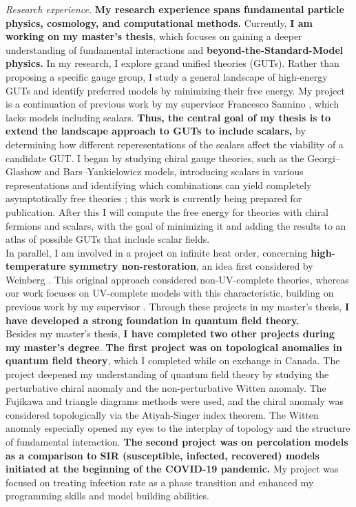 \documentclass[a4paper, 11pt]{article}
\begin{document}
\textit{Research experience.}
\textbf{My research experience spans fundamental particle physics, cosmology, and computational methods.} Currently, \textbf{I am working on my master’s thesis}, which focuses on gaining a deeper understanding of fundamental interactions and \textbf{beyond-the-Standard-Model physics.} In my research, I explore grand unified theories (GUTs). Rather than proposing a specific gauge group, I study a general landscape of high-energy GUTs and identify preferred models by minimizing their free energy. My project is a continuation of previous work by my supervisor Francesco Sannino \cite{Cacciapaglia:2025gta}, which lacks models including scalars. \textbf{Thus, the central goal of my thesis is to extend the landscape approach to GUTs to include scalars,} by determining how different reperesentations of the scalars affect the viability of a candidate GUT.  I began by studying chiral gauge theories, such as the Georgi–Glashow \cite{PhysRevLett.32.438} and Bars–Yankielowicz \cite{Bars1981BY} models, introducing scalars in various representations and identifying which combinations can yield completely asymptotically free theories \cite{SoftenedGravity,Pica2017ConformalPhase,M_lgaard_2017}; this work is currently being prepared for publication. After this I will compute the free energy for theories with chiral fermions and scalars, with the goal of minimizing it and adding the results to an atlas of possible GUTs that include scalar fields. \\
In parallel, I am involved in a project on infinite heat order, concerning \textbf{high-temperature symmetry non-restoration}, an idea first considered by Weinberg \cite{Weinberg1974}. This original approach considered non-UV-complete theories, whereas our work focuses on UV-complete models with this characteristic, building on previous work by my supervisor \cite{BajcLugoSannino2020}.
Through these projects in my master's thesis, \textbf{I have developed a strong foundation in quantum field theory.}\\

Besides my master’s thesis, \textbf{I have completed two other projects during my master’s degree}. \textbf{The first project was on topological anomalies in quantum field theory}, which I completed while on exchange in Canada. The project deepened my understanding of quantum field theory by studying the perturbative chiral anomaly and the non-perturbative Witten anomaly. The Fujikawa and triangle diagrams methods were used, and the chiral anomaly was considered topologically via the Atiyah-Singer index theorem. The Witten anomaly especially opened my eyes to the interplay of topology and the structure of fundamental interaction. \textbf{The second project was on percolation models as a comparison to SIR (susceptible, infected, recovered) models initiated at the beginning of the COVID-19 pandemic.} My project was focused on treating infection rate as a phase transition and enhanced my programming skills and model building abilities.\\ 
\end{document}
